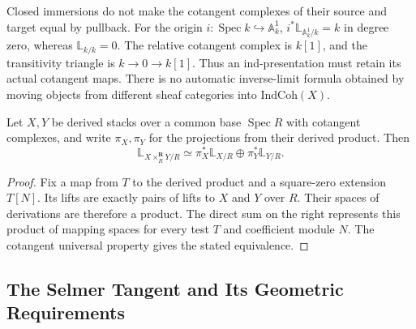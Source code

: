 Closed immersions do not make the cotangent complexes of their source
and target equal by pullback. For the origin
\(i:\operatorname{Spec}k\hookrightarrow\mathbb A^1_k\),
\(i^*\mathbb L_{\mathbb A^1_k/k}=k\) in degree zero, whereas
\(\mathbb L_{k/k}=0\). The relative cotangent complex is \(k[1]\),
and the transitivity triangle is \(k\to0\to k[1]\).
Thus an ind-presentation must retain its actual cotangent maps.
There is no automatic inverse-limit formula obtained by moving objects
from different sheaf categories into \(\mathrm{IndCoh}(X)\).

\begin{corollary}
\label{v4-arith:bzn-sub:cor:cotangent-product}
Let \(X,Y\) be derived stacks over a common base \(\operatorname{Spec}R\)
with cotangent complexes, and write \(\pi_X,\pi_Y\) for the
projections from their derived product. Then
\[
 \mathbb L_{X\times_R^{\mathbf R}Y/R}
 \simeq\pi_X^*\mathbb L_{X/R}\oplus\pi_Y^*\mathbb L_{Y/R}.
\]
\end{corollary}
\begin{proof}
Fix a map from \(T\) to the derived product and a square-zero
extension \(T[N]\). Its lifts are exactly pairs of lifts to
\(X\) and \(Y\) over \(R\). Their spaces of derivations are
therefore a product. The direct sum on the right represents this product of
mapping spaces for every test \(T\) and coefficient module \(N\).
The cotangent universal property gives the stated equivalence.
\end{proof}

\subsection{The Selmer Tangent and Its Geometric Requirements}


